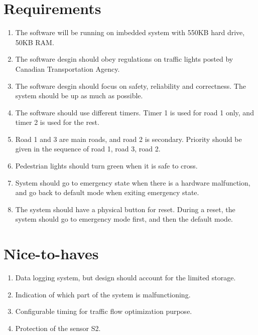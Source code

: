 \documentclass[letterpaper]{article}
\begin{document}
\section{Requirements}
\begin{enumerate}
 \item The software will be running on imbedded system with 550KB hard drive, 50KB RAM.
 \item The software desgin should obey regulations on traffic lights posted by Canadian Transportation Agency.
 \item The software desgin should focus on safety, reliability and correctness. The system should be up as much as possible.
 \item The software should use different timers. Timer 1 is used for road 1 only, and timer 2 is used for the rest.
 \item Road 1 and 3 are main roads, and road 2 is secondary. Priority should be given in the sequence of road 1, road 3, road 2.
 \item Pedestrian lights should turn green when it is safe to cross.
 \item System should go to emergency state when there is a hardware malfunction, and go back to default mode when exiting emergency state.
 \item The system should have a physical button for reset. During a reset, the system should go to emergency mode first, and then the default mode.
\end{enumerate}

\section{Nice-to-haves}
\begin{enumerate}
 \item Data logging system, but design should account for the limited storage.
 \item Indication of which part of the system is malfunctioning.
 \item Configurable timing for traffic flow optimization purpose.
 \item Protection of the sensor S2.
\end{enumerate}
\end{document}
